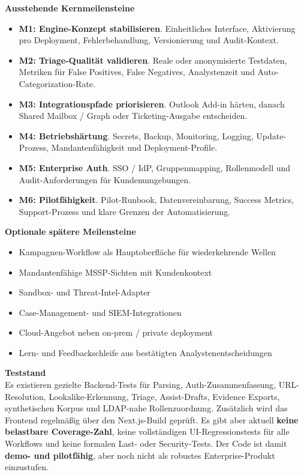 \documentclass[10pt,a4paper]{article}
\begin{document}
\noindent\textbf{Ausstehende Kernmeilensteine}
\begin{itemize}
  \item \textbf{M1: Engine-Konzept stabilisieren}. Einheitliches Interface, Aktivierung pro Deployment, Fehlerbehandlung, Versionierung und Audit-Kontext.
  \item \textbf{M2: Triage-Qualität validieren}. Reale oder anonymisierte Testdaten, Metriken für False Positives, False Negatives, Analystenzeit und Auto-Categorization-Rate.
  \item \textbf{M3: Integrationspfade priorisieren}. Outlook Add-in härten, danach Shared Mailbox / Graph oder Ticketing-Ausgabe entscheiden.
  \item \textbf{M4: Betriebshärtung}. Secrets, Backup, Monitoring, Logging, Update-Prozess, Mandantenfähigkeit und Deployment-Profile.
  \item \textbf{M5: Enterprise Auth}. SSO / IdP, Gruppenmapping, Rollenmodell und Audit-Anforderungen für Kundenumgebungen.
  \item \textbf{M6: Pilotfähigkeit}. Pilot-Runbook, Datenvereinbarung, Success Metrics, Support-Prozess und klare Grenzen der Automatisierung.
\end{itemize}

\noindent\textbf{Optionale spätere Meilensteine}
\begin{itemize}
  \item Kampagnen-Workflow als Hauptoberfläche für wiederkehrende Wellen
  \item Mandantenfähige MSSP-Sichten mit Kundenkontext
  \item Sandbox- und Threat-Intel-Adapter
  \item Case-Management- und SIEM-Integrationen
  \item Cloud-Angebot neben on-prem / private deployment
  \item Lern- und Feedbackschleife aus bestätigten Analystenentscheidungen
\end{itemize}

\noindent\textbf{Teststand}\\
Es existieren gezielte Backend-Tests für Parsing, Auth-Zusammenfassung, URL-Resolution, Lookalike-Erkennung, Triage, Assist-Drafts, Evidence Exports, synthetischen Korpus und LDAP-nahe Rollenzuordnung. Zusätzlich wird das Frontend regelmäßig über den Next.js-Build geprüft. Es gibt aber aktuell \textbf{keine belastbare Coverage-Zahl}, keine vollständigen UI-Regressionstests für alle Workflows und keine formalen Last- oder Security-Tests. Der Code ist damit \textbf{demo- und pilotfähig}, aber noch nicht als robustes Enterprise-Produkt einzustufen.
\end{document}
